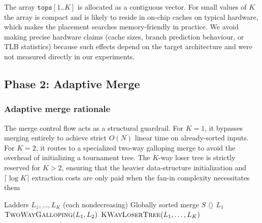 \documentclass[12pt,a4paper]{article}
\theoremstyle{plain}
\theoremstyle{definition}
\newcommand{\tops}{\texttt{tops}}
\begin{document}
The array $\tops[1..K]$ is allocated as a contiguous vector.  For small
values of $K$ the array is compact and is likely to reside in on-chip caches
on typical hardware, which makes the placement searches memory-friendly in
practice.  We avoid making precise hardware claims (cache sizes, branch
prediction behaviour, or TLB statistics) because such effects depend on the
target architecture and were not measured directly in our experiments.

\subsection{Phase 2: Adaptive Merge}
\label{sec:phase2}


\subsubsection{Adaptive merge rationale}
The merge control flow acts as a structural guardrail. For $K=1$, it bypasses merging entirely to achieve strict $O(N)$ linear time on already-sorted inputs. For $K=2$, it routes to a specialized two-way galloping merge to avoid the overhead of initializing a tournament tree. The $K$-way loser tree is strictly reserved for $K > 2$, ensuring that the heavier data-structure initialization and $\lceil \log K \rceil$ extraction costs are only paid when the fan-in complexity necessitates them
\begin{algorithm}[H]
\caption{\textsc{MergeByK}$(L_1, \dots, L_K)$}
\label{alg:mergebyk}
\begin{algorithmic}[1]
\Require Ladders $L_1, \dots, L_K$ (each nondecreasing)
\Ensure Globally sorted merge $S$
 \Return $\langle\rangle$ \EndIf
{} \Return $L_1$ \EndIf
{} \Return $\textsc{TwoWayGalloping}(L_1, L_2)$ \EndIf
\State \Return $\textsc{KWayLoserTree}(L_1, \dots, L_K)$
\end{algorithmic}
\end{algorithm}
\end{document}
